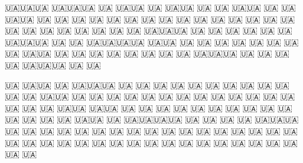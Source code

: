  
 
 
 
 


🇺🇦🇺🇦🇺🇦         🇺🇦🇺🇦🇺🇦          🇺🇦           🇺🇦🇺🇦                🇺🇦
🇺🇦🇺🇦             🇺🇦    🇺🇦        🇺🇦🇺🇦         🇺🇦   🇺🇦           🇺🇦🇺🇦
🇺🇦                 🇺🇦    🇺🇦       🇺🇦  🇺🇦        🇺🇦    🇺🇦         🇺🇦  🇺🇦
🇺🇦                 🇺🇦    🇺🇦      🇺🇦    🇺🇦       🇺🇦     🇺🇦       🇺🇦    🇺🇦
🇺🇦                🇺🇦     🇺🇦     🇺🇦      🇺🇦      🇺🇦🇺🇦🇺🇦       🇺🇦      🇺🇦 
🇺🇦               🇺🇦      🇺🇦    🇺🇦🇺🇦🇺🇦🇺🇦     🇺🇦     🇺🇦     🇺🇦🇺🇦🇺🇦🇺🇦
🇺🇦🇺🇦         🇺🇦        🇺🇦   🇺🇦          🇺🇦    🇺🇦      🇺🇦   🇺🇦          🇺🇦
🇺🇦🇺🇦        🇺🇦         🇺🇦  🇺🇦            🇺🇦   🇺🇦     🇺🇦   🇺🇦            🇺🇦
🇺🇦🇺🇦🇺🇦   🇺🇦          🇺🇦 🇺🇦              🇺🇦  🇺🇦🇺🇦🇺🇦   🇺🇦              🇺🇦

🇺🇦     🇺🇦🇺🇦      🇺🇦  🇺🇦🇺🇦🇺🇦         🇺🇦        🇺🇦  🇺🇦 🇺🇦        🇺🇦  🇺🇦 
🇺🇦    🇺🇦 🇺🇦    🇺🇦    🇺🇦     🇺🇦      🇺🇦🇺🇦         🇺🇦    🇺🇦        🇺🇦  🇺🇦 
 🇺🇦  🇺🇦  🇺🇦 🇺🇦       🇺🇦      🇺🇦    🇺🇦  🇺🇦        🇺🇦    🇺🇦        🇺🇦  🇺🇦
  🇺🇦🇺🇦   🇺🇦🇺🇦        🇺🇦      🇺🇦   🇺🇦    🇺🇦       🇺🇦    🇺🇦        🇺🇦  🇺🇦
    🇺🇦     🇺🇦 🇺🇦       🇺🇦     🇺🇦   🇺🇦 🇺🇦🇺🇦       🇺🇦    🇺🇦🇺🇦🇺🇦🇺🇦  🇺🇦
   🇺🇦      🇺🇦   🇺🇦     🇺🇦🇺🇦🇺🇦   🇺🇦       🇺🇦      🇺🇦    🇺🇦        🇺🇦  🇺🇦
  🇺🇦       🇺🇦     🇺🇦   🇺🇦          🇺🇦         🇺🇦     🇺🇦    🇺🇦        🇺🇦  🇺🇦
 🇺🇦        🇺🇦      🇺🇦  🇺🇦         🇺🇦           🇺🇦    🇺🇦    🇺🇦        🇺🇦  🇺🇦
🇺🇦         🇺🇦      🇺🇦  🇺🇦        🇺🇦             🇺🇦   🇺🇦    🇺🇦        🇺🇦  🇺🇦
